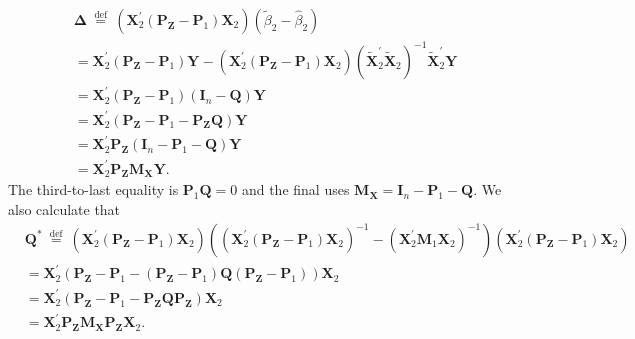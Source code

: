 \documentclass[10pt]{article}
\begin{document}
$$
\begin{aligned}
&\boldsymbol{\Delta} \stackrel{\text { def }}{=}\left(\boldsymbol{X}_{2}^{\prime}\left(\boldsymbol{P}_{\boldsymbol{Z}}-\boldsymbol{P}_{1}\right) \boldsymbol{X}_{2}\right)\left(\widetilde{\beta}_{2}-\widehat{\beta}_{2}\right) \\
&=\boldsymbol{X}_{2}^{\prime}\left(\boldsymbol{P}_{\boldsymbol{Z}}-\boldsymbol{P}_{1}\right) \boldsymbol{Y}-\left(\boldsymbol{X}_{2}^{\prime}\left(\boldsymbol{P}_{\boldsymbol{Z}}-\boldsymbol{P}_{1}\right) \boldsymbol{X}_{2}\right)\left(\widetilde{\boldsymbol{X}}_{2}^{\prime} \widetilde{\boldsymbol{X}}_{2}\right)^{-1} \widetilde{\boldsymbol{X}}_{2}^{\prime} \boldsymbol{Y} \\
&=\boldsymbol{X}_{2}^{\prime}\left(\boldsymbol{P}_{\boldsymbol{Z}}-\boldsymbol{P}_{1}\right)\left(\boldsymbol{I}_{n}-\boldsymbol{Q}\right) \boldsymbol{Y} \\
&=\boldsymbol{X}_{2}^{\prime}\left(\boldsymbol{P}_{\boldsymbol{Z}}-\boldsymbol{P}_{1}-\boldsymbol{P}_{\boldsymbol{Z}} \boldsymbol{Q}\right) \boldsymbol{Y} \\
&=\boldsymbol{X}_{2}^{\prime} \boldsymbol{P}_{\boldsymbol{Z}}\left(\boldsymbol{I}_{n}-\boldsymbol{P}_{1}-\boldsymbol{Q}\right) \boldsymbol{Y} \\
&=\boldsymbol{X}_{2}^{\prime} \boldsymbol{P}_{\boldsymbol{Z}} \boldsymbol{M}_{\boldsymbol{X}} \boldsymbol{Y} .
\end{aligned}
$$
The third-to-last equality is $\boldsymbol{P}_{1} \boldsymbol{Q}=0$ and the final uses $\boldsymbol{M}_{\boldsymbol{X}}=\boldsymbol{I}_{n}-\boldsymbol{P}_{1}-\boldsymbol{Q}$. We also calculate that
$$
\begin{aligned}
&\boldsymbol{Q}^{*} \stackrel{\text { def }}{=}\left(\boldsymbol{X}_{2}^{\prime}\left(\boldsymbol{P}_{\boldsymbol{Z}}-\boldsymbol{P}_{1}\right) \boldsymbol{X}_{2}\right)\left(\left(\boldsymbol{X}_{2}^{\prime}\left(\boldsymbol{P}_{\boldsymbol{Z}}-\boldsymbol{P}_{1}\right) \boldsymbol{X}_{2}\right)^{-1}-\left(\boldsymbol{X}_{2}^{\prime} \boldsymbol{M}_{1} \boldsymbol{X}_{2}\right)^{-1}\right)\left(\boldsymbol{X}_{2}^{\prime}\left(\boldsymbol{P}_{\boldsymbol{Z}}-\boldsymbol{P}_{1}\right) \boldsymbol{X}_{2}\right) \\
&=\boldsymbol{X}_{2}^{\prime}\left(\boldsymbol{P}_{\boldsymbol{Z}}-\boldsymbol{P}_{1}-\left(\boldsymbol{P}_{\boldsymbol{Z}}-\boldsymbol{P}_{1}\right) \boldsymbol{Q}\left(\boldsymbol{P}_{\boldsymbol{Z}}-\boldsymbol{P}_{1}\right)\right) \boldsymbol{X}_{2} \\
&=\boldsymbol{X}_{2}^{\prime}\left(\boldsymbol{P}_{\boldsymbol{Z}}-\boldsymbol{P}_{1}-\boldsymbol{P}_{\boldsymbol{Z}} \boldsymbol{Q} \boldsymbol{P}_{\boldsymbol{Z}}\right) \boldsymbol{X}_{2} \\
&=\boldsymbol{X}_{2}^{\prime} \boldsymbol{P}_{\boldsymbol{Z}} \boldsymbol{M}_{\boldsymbol{X}} \boldsymbol{P}_{\boldsymbol{Z}} \boldsymbol{X}_{2} .
\end{aligned}
$$
\end{document}
